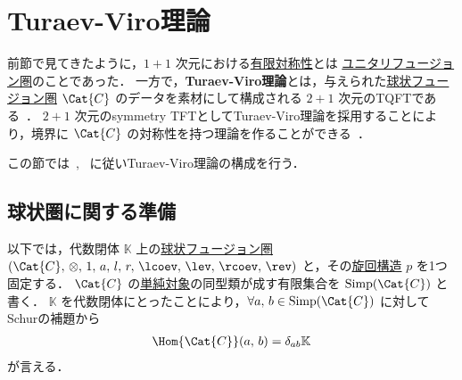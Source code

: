 \documentclass[TQFT_main]{subfiles}
\begin{document}
\section{Turaev-Viro理論}

前節で見てきたように，$1+1$ 次元における\hyperref[ax:symcat-2d-0form]{有限対称性}とは \hyperref[def:tensorfusion-cat]{ユニタリフュージョン圏}のことであった．
一方で，\textbf{Turaev-Viro理論}とは，与えられた\hyperref[def:spherical]{球状フュージョン圏} $\Cat{C}$ のデータを素材にして構成される $2+1$ 次元のTQFTである~\cite{TuraevViro1992TQFT}．
$2+1$ 次元のsymmetry TFTとしてTuraev-Viro理論を採用することにより，境界に $\Cat{C}$ の対称性を持つ理論を作ることができる~\cite{AFM2020}．

この節では~\cite{Bakalov2001lectures}, ~\cite{KirillovBalsam2010TVBW}に従いTuraev-Viro理論の構成を行う．

\subsection{球状圏に関する準備}

以下では，代数閉体 $\mathbb{K}$ 上の\hyperref[def:spherical]{球状フュージョン圏} $(\Cat{C},\, \otimes,\, 1,\, a,\, l,\, r,\, \lcoev,\, \lev,\, \rcoev,\, \rev)$ と，その\hyperref[def:pivotal]{旋回構造} $p$ を1つ固定する．
$\Cat{C}$ の\hyperref[def:semisimple-cat]{単純対象}の同型類が成す有限集合を $\mathrm{Simp}(\Cat{C})$ と書く．
$\mathbb{K}$ を代数閉体にとったことにより，$\forall a,\, b \in \mathrm{Simp}(\Cat{C})$ に対してSchurの補題から
\begin{align}
    \Hom{\Cat{C}} (a,\, b) = \delta_{ab} \mathbb{K}
\end{align}
が言える．
\end{document}
